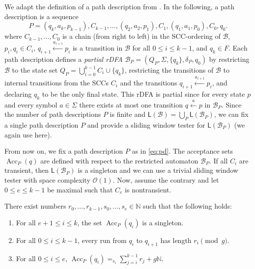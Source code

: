 \documentclass{theoretics}
\newcommand{\N}{\mathbb{N}}
\newcommand{\B}{\mathcal{B}}
\renewcommand{\O}{\mathcal{O}}
\renewcommand{\L}{\mathsf{L}}
\DeclareMathOperator{\Acc}{Acc}
\renewcommand{\leq}{\leqslant}
\renewcommand{\le}{\leq}
\begin{document}
We adapt the definition of a path description from .
In the following, a path description is a sequence
\begin{equation}
	\label{eq:pd}
	P = (q_k,a_k,p_{k-1}),C_{k-1},\dots ,(q_2,a_2,p_1),C_1,(q_1,a_1,p_0),C_0,q_0.
\end{equation}
where $C_{k-1}, \dots, C_0$ is a chain (from right to left) in the SCC-ordering of $\B$,
$p_i, q_i \in C_i$, $q_{i+1} \xleftarrow{a_{i+1}} p_i$ is a transition in $\B$
for all $0 \le i \le k-1$, and $q_k \in F$.
Each path description defines a {\em partial rDFA} $\B_P = (Q_P,\Sigma,\{q_k\},\delta_P,q_0)$
by restricting $\B$ to the state set $Q_P = \bigcup_{i=0}^{k-1}C_i \cup \{q_k\}$,
restricting the transitions of $\B$ to internal transitions from the SCCs $C_i$
and the transitions $q_{i+1} \xleftarrow{a_{i+1}} p_i$,
and declaring $q_k$ to be the only final state.
This rDFA is partial since for every state $p$ and every symbol $a \in \Sigma$
there exists at most one transition $q \xleftarrow{a} p$ in $\B_P$.
Since the number of path descriptions $P$ is finite and $\L(\B) = \bigcup_P \L(\B_P)$,
we can fix a single path description $P$ and provide a sliding window tester for $\L(\B_P)$
(we again use  here).

From now on, we fix a path description $P$ as in \eqref{eq:pd}.
The acceptance sets $\Acc_P(q)$ are defined with respect to the restricted automaton $\B_P$. 
If all $C_i$ are transient, then $\L(\B_P)$ is a singleton and we can use a trivial sliding window tester with space complexity $\O(1)$.
Now, assume the contrary and let $0 \le e \le k-1$ be maximal such that $C_e$ is nontransient. 

\begin{lemma} \label{lemma-si-ri}
There exist numbers $r_0, \ldots, r_{k-1}, s_0, \ldots, s_e \in \N$ such that the following holds:
\begin{enumerate}[label=(\roman{*}), ref=(\roman{*})]
\item For all $e+1 \le i \le k$, the set $\Acc_P(q_i)$ is a singleton. \label{item:siri1}
\item For all $0 \le i \le k-1$, every run from $q_i$ to $q_{i+1}$ has length $r_i \pmod g$. \label{item:siri2}
\item For all $0 \le i \le e$, $\Acc_P(q_i) =_{s_i} \sum_{j=i}^{k-1} r_j + g \N$.\label{item:siri3}
\end{enumerate}
\end{lemma}
\end{document}
